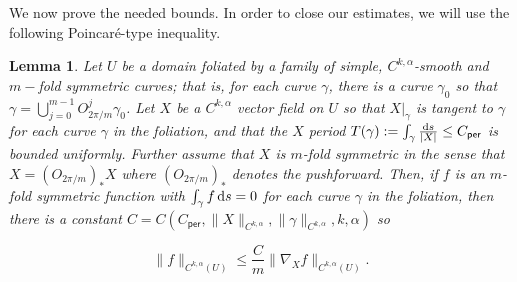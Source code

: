 \documentclass[11pt]{article}
\theoremstyle{plain}
\numberwithin{equation}{section}
\newtheorem{lemma}[thm]{Lemma}
\theoremstyle{remark}
\newcommand{\rmd}{{\rm d}}
\begin{document}
We now prove the needed bounds. In order to close our estimates, we will use the following
Poincar\'{e}-type inequality.
\begin{lemma}
  \label{Xpoin}
  Let $U$ be a domain foliated by a family of simple, $C^{k,\alpha}$-smooth
  and $m-$fold symmetric curves; that is, for each curve
  $\gamma$, there is a curve $\gamma_0$ so that
  $\gamma = \bigcup_{j=0}^{m-1}  O_{2\pi/m}^j\gamma_0$.
  Let $X$ be a $C^{k,\alpha}$ vector field on $U$ so that $X|_\gamma$ is tangent
  to $\gamma$ for each curve $\gamma$ in the foliation, and that the $X$ period $T(\gamma) := \int_\gamma \frac{\rmd s}{|X|}\leq C_{\mathsf{per}}$ is bounded uniformly.
  Further assume that $X$ is $m$-fold symmetric in the sense that $X= ({O_{2\pi/m}})_* X$
  where $({O_{2\pi/m}})_* $ denotes the pushforward.  Then, if $f$ is an $m$-fold symmetric function with $\int_{\gamma} f\, \rmd s = 0$ for each
  curve $\gamma$ in the foliation, then there is a constant
  $C = C\left(C_{\mathsf{per}},\|X\|_{C^{k,\alpha}}, \|\gamma\|_{C^{k,\alpha}},
     k, \alpha\right)$ so 

  \begin{equation}
    \label{poin}
    \| f \|_{C^{k,\alpha}(U)} \leq   \frac{C}{m} \| \nabla_X f\|_{C^{k,\alpha}(U)}.
  \end{equation}

\end{lemma}
\end{document}
